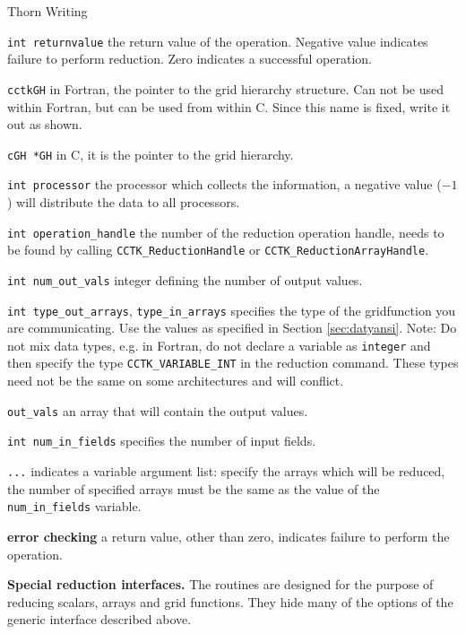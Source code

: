 \begin{cactuspart}{Thorn Writing}
\begin{Lentry}
\item[\texttt{int returnvalue}] 
the return value of the operation. Negative
value indicates failure to perform reduction.
Zero indicates a successful operation.
\item[\texttt{cctkGH}]
in Fortran, the pointer to the grid hierarchy
structure. Can not be used within Fortran, but
can be used from within 
C. Since this name is fixed, write it out as shown.
\item[\texttt{cGH *GH}]
 in C, it is the pointer to the grid hierarchy.
\item[\texttt{int processor}] 
the processor which collects the
information, a negative value ($-1$) will distribute the data to all
processors.
\item[\texttt{int operation\_handle}] the number of the reduction operation
                handle, needs to be found by calling \texttt{CCTK\_ReductionHandle} or
                \texttt{CCTK\_ReductionArrayHandle}.
\item[\texttt{int num\_out\_vals}] integer defining the number of output values.
\item[\texttt{int type\_out\_arrays}, \texttt{type\_in\_arrays}] 
specifies the type of the gridfunction 
you are communicating. Use the values as specified in Section
\ref{sec:datyansi}. Note: Do not mix data types, e.g. in
Fortran, do not declare a variable as \texttt{integer} and then specify  
the type \texttt{CCTK\_VARIABLE\_INT} in the reduction command. These
types need not be the same on some architectures and will conflict.
\item[\texttt{out\_vals}] an array that will contain the output values.
\item[\texttt{int num\_in\_fields}] specifies the number of input fields.
\item[\texttt{...}] indicates a variable argument list: specify the arrays which will be reduced, the number of
specified arrays must be the same as the value of the {\tt
num\_in\_fields} variable.
\item[{\bf error checking}] a return value, other than zero, indicates
failure to perform the operation.
\end{Lentry}

\vskip 0.25cm


{\bf Special reduction interfaces.} The routines are designed for the purpose of reducing scalars, arrays
and grid functions. They hide many of the options of the generic
interface described above.


\end{cactuspart}
